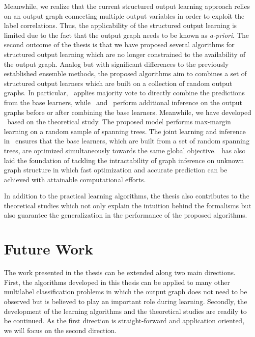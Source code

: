 {Meanwhile, we realize that the current structured output learning approach relies on an output graph connecting multiple output variables in order to exploit the label correlations.
Thus, the applicability of the structured output learning is limited due to the fact that the output graph needs to be known as \textit{a-priori}.
The second outcome of the thesis is that we have proposed several algorithms for structured output learning which are no longer constrained to the availability of the output graph.
Analog but with significant differences to the previously established ensemble methods, the proposed algorithms aim to combines a set of structured output learners which are built on a collection of random output graphs.
In particular, \mve\ applies majority vote to directly combine the predictions from the base learners, while \amm\ and \mam\ perform additional inference on the output graphs before or after combining the base learners.
Meanwhile, we have developed \rta\ based on the theoretical study.
The proposed model performs max-margin learning on a random sample of spanning trees.
The joint learning and inference in \rta\ ensures that the base learners, which are built from a set of random spanning trees, are optimized simultaneously towards the same global objective.
\rta\ has also laid the foundation of tackling the intractability of graph inference on unknown graph structure in which fast optimization and accurate prediction can be achieved with attainable computational efforts.

In addition to the practical learning algorithms, the thesis also contributes to the theoretical studies which not only explain the intuition behind the formalisms but also guarantee the generalization in the performance of the proposed algorithms.



\section{Future Work}

The work presented in the thesis can be extended along two main directions.
First, the algorithms developed in this thesis can be applied to many other multilabel classification problems in which the output graph does not need to be observed but is believed to play an important role during learning.
Secondly, the development of the learning algorithms and the theoretical studies are readily to be continued.
As the first direction is straight-forward and application oriented, we will focus on the second direction.

}
